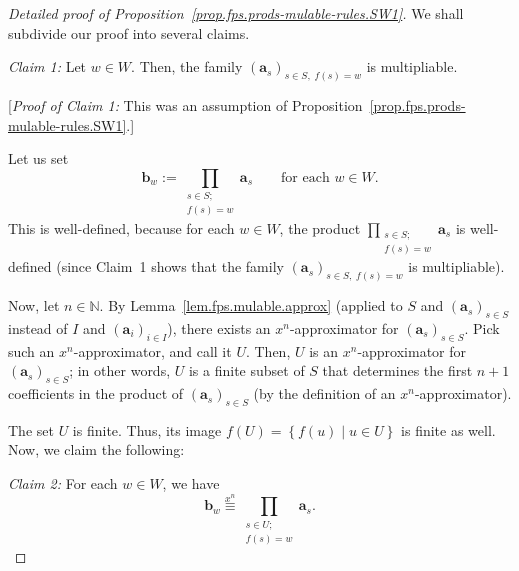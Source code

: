 \begin{proof}[Detailed proof of Proposition~\ref{prop.fps.prods-mulable-rules.SW1}]
\leanok
We shall subdivide our proof into several claims.

\emph{Claim 1:} Let $w \in W$. Then, the family
$\left(\mathbf{a}_{s}\right)_{s \in S,\; f(s) = w}$ is multipliable.

[\emph{Proof of Claim 1:} This was an assumption of
Proposition~\ref{prop.fps.prods-mulable-rules.SW1}.]

Let us set
\[
\mathbf{b}_{w} := \prod_{\substack{s \in S;\\ f(s) = w}}
\mathbf{a}_{s}
\qquad \text{for each } w \in W.
\]
This is well-defined, because for each $w \in W$, the product
$\prod_{\substack{s \in S;\\ f(s) = w}} \mathbf{a}_{s}$ is well-defined
(since Claim~1 shows that the family
$\left(\mathbf{a}_{s}\right)_{s \in S,\; f(s) = w}$ is multipliable).

Now, let $n \in \mathbb{N}$. By Lemma~\ref{lem.fps.mulable.approx}
(applied to $S$ and $\left(\mathbf{a}_{s}\right)_{s \in S}$ instead of
$I$ and $\left(\mathbf{a}_{i}\right)_{i \in I}$), there exists an
$x^n$-approximator for $\left(\mathbf{a}_{s}\right)_{s \in S}$. Pick
such an $x^n$-approximator, and call it $U$. Then, $U$ is an
$x^n$-approximator for $\left(\mathbf{a}_{s}\right)_{s \in S}$; in
other words, $U$ is a finite subset of $S$ that determines the first
$n+1$ coefficients in the product of
$\left(\mathbf{a}_{s}\right)_{s \in S}$ (by the definition of an
$x^n$-approximator).

The set $U$ is finite. Thus, its image
$f(U) = \left\{f(u) \mid u \in U\right\}$ is finite as well. Now, we
claim the following:

\emph{Claim 2:} For each $w \in W$, we have
\[
\mathbf{b}_{w} \overset{x^n}{\equiv}
\prod_{\substack{s \in U;\\ f(s) = w}} \mathbf{a}_{s}.
\]


\end{proof}
